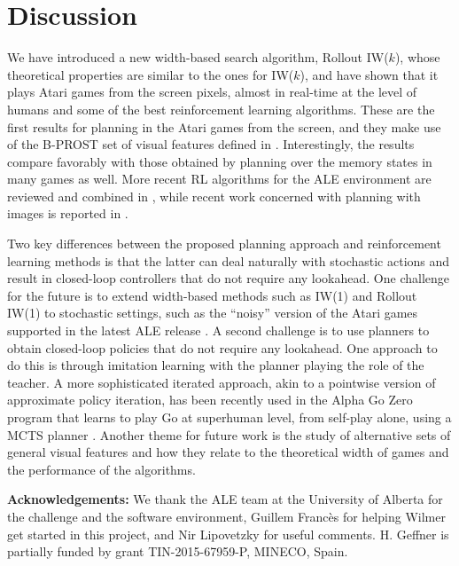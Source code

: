 \documentclass[letterpaper]{article}
\begin{document}
\section{Discussion}

We have introduced a new width-based search algorithm, Rollout IW($k$), whose
theoretical properties are similar to the ones for IW($k$), and have shown that
it plays Atari games from the screen pixels, almost in real-time at the level
of humans and some of the best reinforcement learning algorithms.
These are the first results for planning in the Atari games from the screen, and
they make use of the B-PROST set of visual features defined in \cite{shallow}.
Interestingly, the results compare favorably with those obtained by planning over
the memory states in many games as well. More recent RL algorithms for the ALE
environment are reviewed and combined in \cite{silver:rainbow}, while recent work
concerned with planning with images is reported in \cite{fukunaga:planning-images}.



Two key differences between the proposed planning approach and reinforcement learning
methods is that the latter can deal naturally with stochastic actions and result in
closed-loop controllers that do not require any lookahead.
One challenge for the future is to extend width-based methods such as IW(1) and Rollout IW(1)
to stochastic settings, such as the ``noisy'' version of the Atari games supported in the
latest ALE release \cite{machado:ale}. A second challenge is to use planners to
obtain closed-loop policies that do not require any lookahead. One approach to do this
is through imitation learning with the planner playing the role of the teacher.
A more sophisticated iterated approach, akin to a pointwise version of approximate policy iteration,
has been recently used in the Alpha Go Zero program that learns to play Go at superhuman level,
from self-play alone, using a MCTS planner \cite{alpha-zero-go}.
Another theme for future work is the study of alternative sets of general visual
features and how they relate to the theoretical width of games and the performance
of the algorithms.


\medskip
\vspace{-2.04mm}
\noindent\textbf{Acknowledgements:}
We thank the ALE team at the University of Alberta for the challenge and the software environment,
Guillem Franc\`es for helping Wilmer get started in this project, and
Nir Lipovetzky for useful comments.
H. Geffner is partially funded by grant TIN-2015-67959-P, MINECO, Spain.
\end{document}
